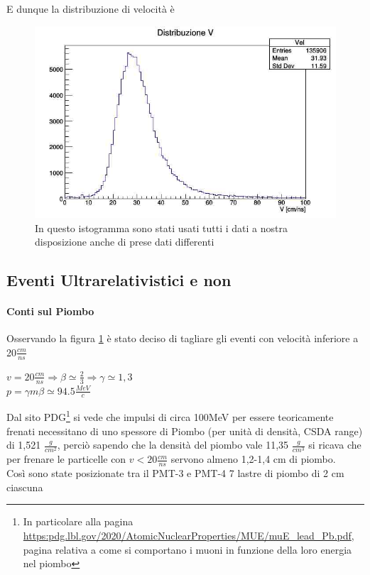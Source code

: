 \documentclass[a4paper]{article}
\begin{document}
E dunque la distribuzione di velocità è

\begin{figure}[H]
\centering
\includegraphics[scale=0.4]{./immagini/TimeOfFlight/VTripleFore.jpg}
\caption{In questo istogramma sono stati usati tutti i dati a nostra disposizione anche di prese dati differenti}
\label{fig:VFore}
\end{figure}

\subsection{Eventi Ultrarelativistici e non}
\label{sec:RapportoU-N}
\paragraph{Conti sul Piombo}
Osservando la figura \ref{fig:VFore} è stato deciso di tagliare gli eventi con velocità inferiore a 20$\frac{cm}{ns}$
\begin{center}
$v = 20\frac{cm}{ns} \Rightarrow \beta \simeq \frac{2}{3} \Rightarrow \gamma \simeq 1,3$ \\ $ p=\gamma m \beta \simeq 94.5 \frac{MeV}{c} $
\end{center}

Dal sito PDG\footnote{In particolare alla pagina \url{https:pdg.lbl.gov/2020/AtomicNuclearProperties/MUE/muE_lead_Pb.pdf}, pagina relativa a come si comportano i muoni in funzione della loro energia nel piombo} si vede che impulsi di circa 100MeV per essere teoricamente frenati necessitano di uno spessore di Piombo (per unità di densità, CSDA range) di 1,521 $\frac{g}{cm^2}$, perciò sapendo che la densità del piombo vale 11,35 $\frac{g}{cm^3}$ si ricava che per frenare le particelle con $v<20\frac{cm}{ns}$ servono almeno 1,2-1,4 cm di piombo.\\
Così sono state posizionate tra il PMT-3 e PMT-4 7 lastre di piombo di 2 cm ciascuna
\end{document}
